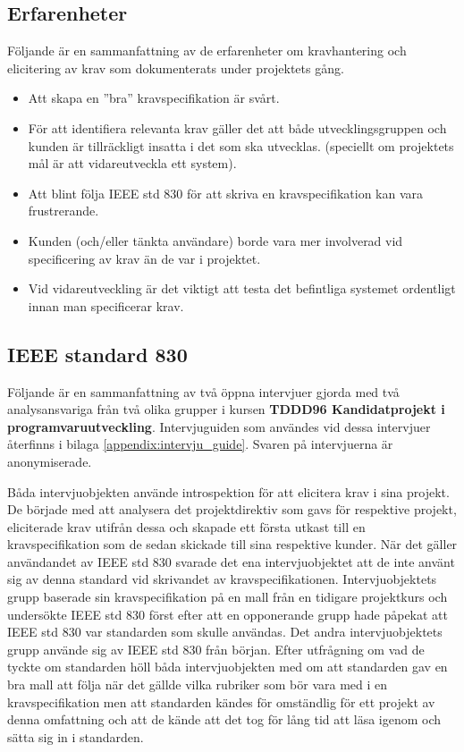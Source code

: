 \subsection{Erfarenheter}
\label{sec:expreience-jannering}
Följande är en sammanfattning av de erfarenheter om kravhantering och elicitering av krav som dokumenterats under projektets gång.
\begin{itemize}
	\item Att skapa en ”bra” kravspecifikation är svårt.
	\item För att identifiera relevanta krav gäller det att både utvecklingsgruppen och kunden är tillräckligt insatta i det som ska utvecklas. (speciellt om projektets mål är att vidareutveckla ett system).
	\item Att blint följa IEEE std 830 för att skriva en kravspecifikation kan vara frustrerande.
	\item Kunden (och/eller tänkta användare) borde vara mer involverad vid specificering av krav än de var i projektet.
	\item Vid vidareutveckling är det viktigt att testa det befintliga systemet ordentligt innan man specificerar krav.
\end{itemize}

\subsection{IEEE standard 830}
Följande är en sammanfattning av två öppna intervjuer gjorda med två analysansvariga från två olika grupper i kursen \textbf{TDDD96 	Kandidatprojekt i programvaruutveckling}. Intervjuguiden som användes vid dessa intervjuer återfinns i bilaga \ref{appendix:intervju_guide}. Svaren på intervjuerna är anonymiserade.  

Båda intervjuobjekten använde introspektion för att elicitera krav i sina projekt. De började med att analysera det projektdirektiv som gavs för respektive projekt, eliciterade krav utifrån dessa och skapade ett första utkast till en kravspecifikation som de sedan skickade till sina respektive kunder. När det gäller användandet av IEEE std 830 svarade det ena intervjuobjektet att de inte använt sig av denna standard vid skrivandet av kravspecifikationen. Intervjuobjektets grupp baserade sin kravspecifikation på en mall från en tidigare projektkurs och undersökte IEEE std 830 först efter att en opponerande grupp hade påpekat att IEEE std 830 var standarden som skulle användas. Det andra intervjuobjektets grupp använde sig av IEEE std 830 från början. Efter utfrågning om vad de tyckte om standarden höll båda intervjuobjekten med om att standarden gav en bra mall att följa när det gällde vilka rubriker som bör vara med i en kravspecifikation men att standarden kändes för omständlig för ett projekt av denna omfattning och att de kände att det tog för lång tid att läsa igenom och sätta sig in i standarden.          


